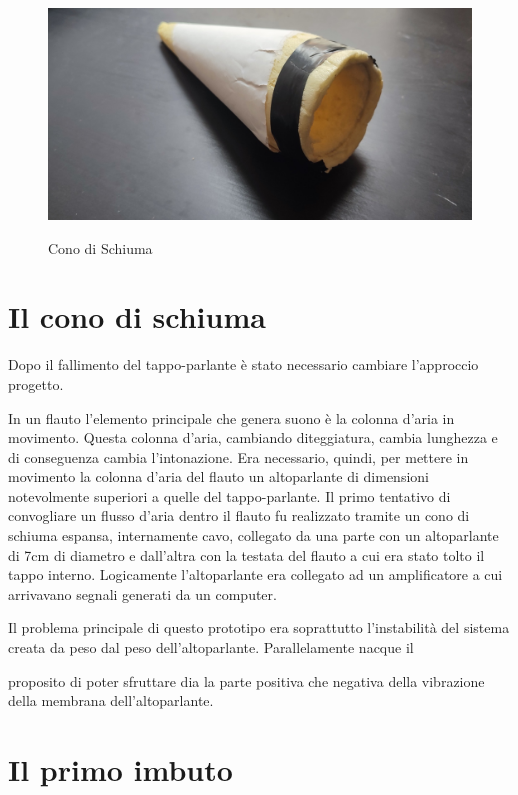 \begin{figure}
\centering
{\includegraphics[width=.98\columnwidth]{Graphics/foto/schiuma}}
\caption{Cono di Schiuma}
\label{fig:schiuma}
\end{figure}

\section{Il cono di schiuma}

Dopo il fallimento del tappo-parlante è stato necessario cambiare l’approccio  progetto.

In un flauto l’elemento principale che genera suono è la colonna d’aria in movimento. Questa colonna d’aria, cambiando diteggiatura, cambia lunghezza e di conseguenza cambia l’intonazione.
Era necessario, quindi, per mettere in movimento la colonna d’aria del flauto un altoparlante di dimensioni notevolmente superiori a quelle del tappo-parlante.
Il primo tentativo di convogliare un flusso d’aria dentro il flauto fu realizzato tramite un cono di schiuma espansa, internamente cavo, collegato da una parte con un altoparlante di 7cm di diametro e dall’altra con la testata del flauto a cui era stato tolto il tappo interno. Logicamente l’altoparlante era collegato ad un amplificatore a cui arrivavano segnali generati da un computer.

Il problema principale di questo prototipo era soprattutto l’instabilità del sistema creata da peso dal peso dell’altoparlante. Parallelamente nacque il

proposito di poter sfruttare dia la parte positiva che negativa della vibrazione della membrana dell’altoparlante.



\section{Il primo imbuto}

